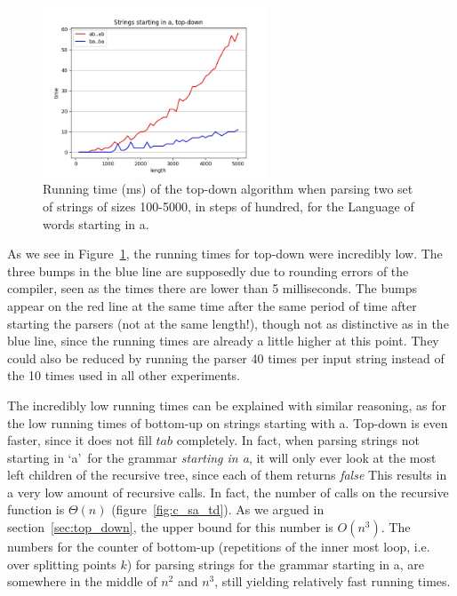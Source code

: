 \begin{figure}[h!]
    \centering
    \includegraphics[width=0.6\textwidth]{Resources/t_sa_td.jpg}
    \caption{Running time (ms) of the top-down algorithm when parsing two set of strings of sizes 100-5000, in steps of hundred, for the Language of words starting in a.}
    \label{fig:t_sa_td}
\end{figure}

As we see in Figure~\ref{fig:t_sa_td}, the running times for top-down were incredibly low.
The three bumps in the blue line are supposedly due to rounding errors of the compiler, seen as the times there are lower than 5 milliseconds.
The bumps appear on the red line at the same time after the same period of time after starting the parsers (not at the same length!), though not as distinctive as in the blue line, since the running times are already a little higher at this point.
They could also be reduced by running the parser 40 times per input string instead of the 10 times used in all other experiments.

The incredibly low running times can be explained with similar reasoning, as for the low running times of bottom-up on strings starting with a.
Top-down is even faster, since it does not fill $tab$ completely.
In fact, when parsing strings not starting in \lq a\rq~for the grammar \textit{starting in a}, it will only ever look at the most left children of the recursive tree, since each of them returns \textit{false}
This results in a very low amount of recursive calls.
In fact, the number of calls on the recursive function is $\Theta(n)$ (figure~\ref{fig:c_sa_td}).
As we argued in section~\ref{sec:top_down}, the upper bound for this number is $O(n^3)$.
The numbers for the counter of bottom-up (repetitions of the inner most loop, i.e. over splitting points $k$) for parsing strings for the grammar starting in a, are somewhere in the middle of $n^2$ and $n^3$, still yielding relatively fast running times.

